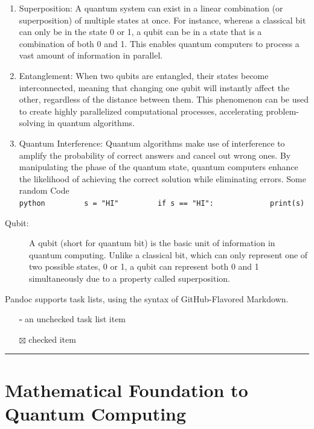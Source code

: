 \documentclass[
  12pt,
  a4paper,
  ]{report}
\providecommand{\tightlist}{%
  \setlength{\itemsep}{0pt}\setlength{\parskip}{0pt}}
\begin{document}
\begin{enumerate}
\def\labelenumi{\arabic{enumi}.}
\item
  Superposition: A quantum system can exist in a linear combination (or
  superposition) of multiple states at once. For instance, whereas a
  classical bit can only be in the state 0 or 1, a qubit can be in a
  state that is a combination of both 0 and 1. This enables quantum
  computers to process a vast amount of information in parallel.
\item
  Entanglement: When two qubits are entangled, their states become
  interconnected, meaning that changing one qubit will instantly affect
  the other, regardless of the distance between them. This phenomenon
  can be used to create highly parallelized computational processes,
  accelerating problem-solving in quantum algorithms.
\item
  Quantum Interference: Quantum algorithms make use of interference to
  amplify the probability of correct answers and cancel out wrong ones.
  By manipulating the phase of the quantum state, quantum computers
  enhance the likelihood of achieving the correct solution while
  eliminating errors. Some random Code
  \texttt{python\ \ \ \ \ \ \ \ \ s\ =\ "HI"\ \ \ \ \ \ \ \ \ if\ s\ ==\ "HI":\ \ \ \ \ \ \ \ \ \ \ \ \ print(s)}
\end{enumerate}

\begin{description}
\item[Qubit:]
A qubit (short for quantum bit) is the basic unit of information in
quantum computing. Unlike a classical bit, which can only represent one
of two possible states, 0 or 1, a qubit can represent both 0 and 1
simultaneously due to a property called superposition.
\end{description}

Pandoc supports task lists, using the syntax of GitHub-Flavored
Markdown.

\begin{itemize}
\tightlist
\item[$\square$]
  an unchecked task list item
\item[$\boxtimes$]
  checked item
\end{itemize}

\begin{center}\rule{0.5\linewidth}{0.5pt}\end{center}

\chapter{Mathematical Foundation to Quantum Computing}\label{chap1}
\end{document}
